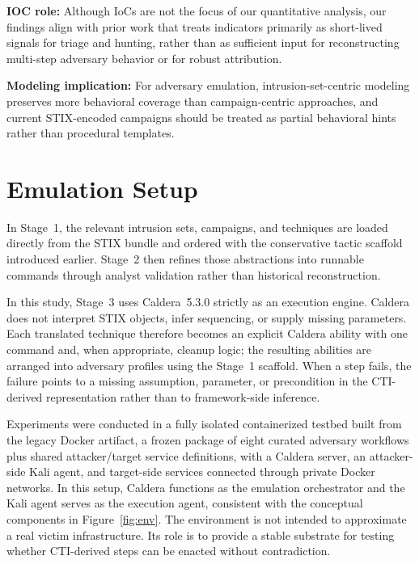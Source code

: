 \documentclass[sigconf]{acmart}
\newcommand{\stix}{STIX\xspace}
\newcommand{\caldera}{Caldera\xspace}
\begin{document}
\begin{textbox}
  \textbf{IOC role:}
  Although IoCs are not the focus of our quantitative analysis, our findings align with prior work that treats indicators primarily as short-lived signals for triage and hunting, rather than as sufficient input for reconstructing multi-step adversary behavior or for robust attribution.

  \textbf{Modeling implication:}
  For adversary emulation, intrusion-set-centric modeling preserves more behavioral coverage than campaign-centric approaches, and current \stix{}-encoded campaigns should be treated as partial behavioral hints rather than procedural templates.
\end{textbox}

\section{Emulation Setup}
\label{sec:emulation}

In Stage~1, the relevant intrusion sets, campaigns, and techniques are loaded directly from the \stix{} bundle and ordered with the conservative tactic scaffold introduced earlier. Stage~2 then refines those abstractions into runnable commands through analyst validation rather than historical reconstruction.

In this study, Stage~3 uses \caldera{}~5.3.0 strictly as an execution engine. \caldera{} does not interpret \stix{} objects, infer sequencing, or supply missing parameters. Each translated technique therefore becomes an explicit \caldera{} ability with one command and, when appropriate, cleanup logic; the resulting abilities are arranged into adversary profiles using the Stage~1 scaffold. When a step fails, the failure points to a missing assumption, parameter, or precondition in the CTI-derived representation rather than to framework-side inference.

Experiments were conducted in a fully isolated containerized testbed built from the legacy Docker artifact, a frozen package of eight curated adversary workflows plus shared attacker/target service definitions, with a \caldera{} server, an attacker-side Kali agent, and target-side services connected through private Docker networks. In this setup, \caldera{} functions as the emulation orchestrator and the Kali agent serves as the execution agent, consistent with the conceptual components in Figure~\ref{fig:env}. The environment is not intended to approximate a real victim infrastructure. Its role is to provide a stable substrate for testing whether CTI-derived steps can be enacted without contradiction.
\end{document}
